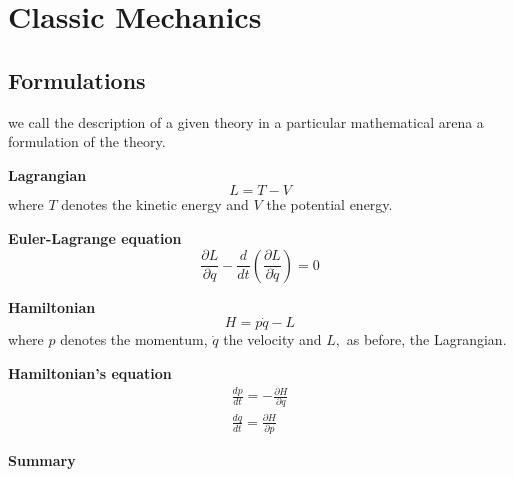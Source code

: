 \section{Classic Mechanics}
\subsection{Formulations}
we call the description of a given theory in a particular mathematical arena a formulation of the theory.

\textbf{Lagrangian}
$$
L=T-V
$$
where $T$ denotes the kinetic energy and $V$ the potential energy.

\textbf{Euler-Lagrange equation}
$$
\frac{\partial L}{\partial q}-\frac{d}{d t}\left(\frac{\partial L}{\partial \dot{q}}\right)=0
$$

\textbf{Hamiltonian}
$$
H=p \dot{q}-L
$$
where $p$ denotes the momentum, $\dot{q}$ the velocity and $L,$ as before,
the Lagrangian. 

\textbf{Hamiltonian's equation}
$$
\begin{array}{l}{\frac{d p}{d t}=-\frac{\partial H}{\partial q}} \\ {\frac{d q}{d t}=\frac{\partial H}{\partial p}}\end{array}
$$

\textbf{Summary}



